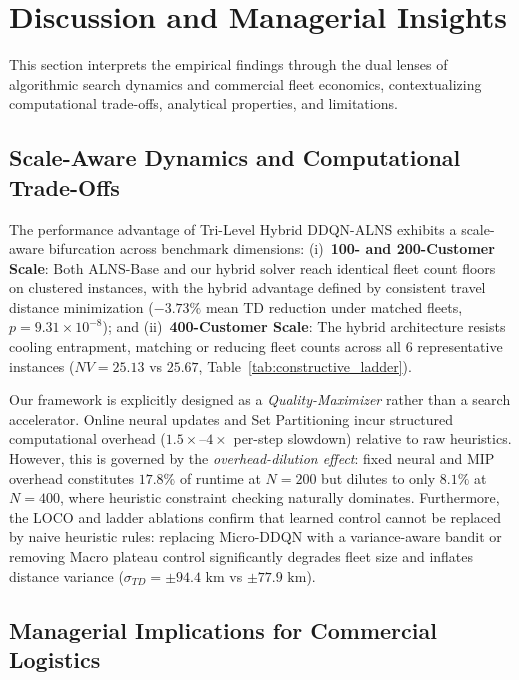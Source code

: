 \documentclass{ieeeaccess}
\begin{document}
\section{Discussion and Managerial Insights}
\label{sec:discussion}

This section interprets the empirical findings through the dual lenses of algorithmic search dynamics and commercial fleet economics, contextualizing computational trade-offs, analytical properties, and limitations.

\subsection{Scale-Aware Dynamics and Computational Trade-Offs}
\label{sec:disc_scale_aware}

The performance advantage of Tri-Level Hybrid DDQN-ALNS exhibits a scale-aware bifurcation across benchmark dimensions: (i)~\textbf{100- and 200-Customer Scale}: Both ALNS-Base and our hybrid solver reach identical fleet count floors on clustered instances, with the hybrid advantage defined by consistent travel distance minimization ($-3.73\%$ mean TD reduction under matched fleets, $p=9.31 \times 10^{-8}$); and (ii)~\textbf{400-Customer Scale}: The hybrid architecture resists cooling entrapment, matching or reducing fleet counts across all 6 representative instances ($NV=25.13$ vs $25.67$, Table~\ref{tab:constructive_ladder}).

Our framework is explicitly designed as a \emph{Quality-Maximizer} rather than a search accelerator. Online neural updates and Set Partitioning incur structured computational overhead ($1.5\times\text{--}4\times$ per-step slowdown) relative to raw heuristics. However, this is governed by the \textit{overhead-dilution effect}: fixed neural and MIP overhead constitutes $17.8\%$ of runtime at $N=200$ but dilutes to only $8.1\%$ at $N=400$, where heuristic constraint checking naturally dominates. Furthermore, the LOCO and ladder ablations confirm that learned control cannot be replaced by naive heuristic rules: replacing Micro-DDQN with a variance-aware bandit or removing Macro plateau control significantly degrades fleet size and inflates distance variance ($\sigma_{TD} = \pm 94.4\text{ km}$ vs $\pm 77.9\text{ km}$).

\subsection{Managerial Implications for Commercial Logistics}
\label{sec:disc_managerial}
\end{document}
